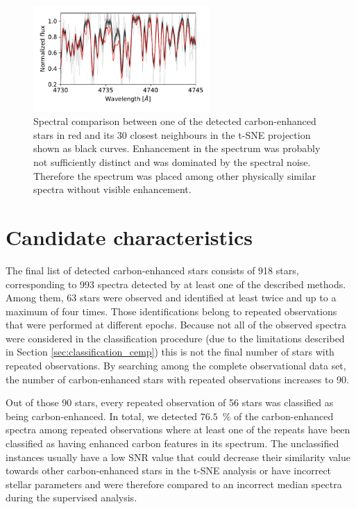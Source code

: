 \begin{figure}
	\centering
	\includegraphics[width=0.6\textwidth]{150206004301057_tsne_close30.pdf}
	\caption{Spectral comparison between one of the detected carbon-enhanced stars in red and its 30 closest neighbours in the t-SNE projection shown as black curves. Enhancement in the spectrum was probably not sufficiently distinct and was dominated by the spectral noise. Therefore the spectrum was placed among other physically similar spectra without visible enhancement.}
	\label{fig:tsne_30close}
\end{figure}

\section{Candidate characteristics}
\label{sec:analysis_cemp}
The final list of detected carbon-enhanced stars consists of 918 stars, corresponding to 993 spectra detected by at least one of the described methods. Among them, 63 stars were observed and identified at least twice and up to a maximum of four times. Those identifications belong to repeated observations that were performed at different epochs. Because not all of the observed spectra were considered in the classification procedure (due to the limitations described in Section \ref{sec:classification_cemp}) this is not the final number of stars with repeated observations. By searching among the complete observational data set, the number of carbon-enhanced stars with repeated observations increases to 90.

Out of those 90 stars, every repeated observation of 56 stars was classified as being carbon-enhanced. In total, we detected $76.5$~\% of the carbon-enhanced spectra among repeated observations where at least one of the repeats have been classified as having enhanced carbon features in its spectrum. The unclassified instances usually have a low SNR value that could decrease their similarity value towards other carbon-enhanced stars in the t-SNE analysis or have incorrect stellar parameters and were therefore compared to an incorrect median spectra during the supervised analysis.

